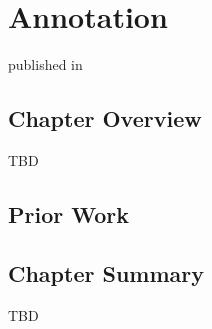\chapter{Annotation}
\label{ch:annotation}

published in \newcite{}

\section{Chapter Overview}

TBD

\section{Prior Work}

\section{Chapter Summary}

TBD